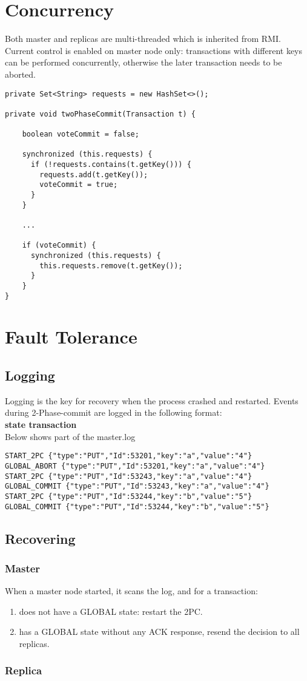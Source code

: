 \documentclass[11pt, oneside]{article}   	%
\begin{document}
\section{Concurrency}
\label{sec:concurrency}
Both master and replicas are multi-threaded which is inherited from RMI. \\
Current control is enabled on master node only: transactions with different keys can be performed concurrently, otherwise the later transaction needs to be aborted.
\begin{verbatim}               
private Set<String> requests = new HashSet<>();

private void twoPhaseCommit(Transaction t) {

    boolean voteCommit = false;

    synchronized (this.requests) {
      if (!requests.contains(t.getKey())) {
        requests.add(t.getKey());
        voteCommit = true;
      }
    }
    
    ...
    
    if (voteCommit) {
      synchronized (this.requests) {
        this.requests.remove(t.getKey());
      }
    }
}
\end{verbatim}

\section{Fault Tolerance}
\subsection{Logging}
Logging is the key for recovery when the process crashed and restarted.
Events during 2-Phase-commit are logged in the following format: \\
{\bf state transaction} \\
Below shows part of the master.log
\begin{verbatim}
START_2PC {"type":"PUT","Id":53201,"key":"a","value":"4"}
GLOBAL_ABORT {"type":"PUT","Id":53201,"key":"a","value":"4"}
START_2PC {"type":"PUT","Id":53243,"key":"a","value":"4"}
GLOBAL_COMMIT {"type":"PUT","Id":53243,"key":"a","value":"4"}
START_2PC {"type":"PUT","Id":53244,"key":"b","value":"5"}
GLOBAL_COMMIT {"type":"PUT","Id":53244,"key":"b","value":"5"}
\end{verbatim}
\subsection{Recovering}
\subsubsection{Master}
When a master node started, it scans the log, and for a transaction:
\begin{enumerate}
\item does not have a GLOBAL state: restart the 2PC.
\item has a GLOBAL state without any ACK response, resend the decision to all replicas.
\end{enumerate}
\subsubsection{Replica}
\end{document}

